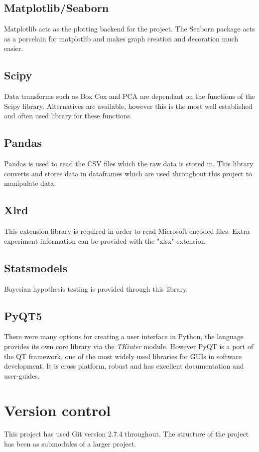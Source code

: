 \documentclass[11pt]{report}
\begin{document}
\subsection{Matplotlib/Seaborn}
\label{sec:org0706bbe}
Matplotlib acts as the plotting backend for the project. The Seaborn package acts as a porcelain for matplotlib and makes graph creation and decoration much easier.
\subsection{Scipy}
\label{sec:orge8a91fb}
Data transforms such as Box Cox and PCA are dependant on the functions of the Scipy library. Alternatives are available, however this is the most well established and often used library for these functions.
\subsection{Pandas}
\label{sec:org3f1ad8c}
Pandas is used to read the CSV files which the raw data is stored in. This library converts and stores data in dataframes which are used throughout this project to manipulate data.
\subsection{Xlrd}
\label{sec:org2e7eeee}
This extension library is required in order to read Microsoft encoded files. Extra experiment information can be provided with the "xlsx" extension.
\subsection{Statsmodels}
\label{sec:orgf190e88}
Bayesian hypothesis testing is provided through this library.
\subsection{PyQT5}
\label{sec:orgbbc5a26}
There were many options for creating a user interface in Python, the language provides its own core library via the \emph{TKinter} module. However PyQT is a port of the QT framework, one of the most widely used libraries for GUIs in software development. It is cross platform, robust and has excellent documentation and user-guides.
\section{Version control}
\label{sec:orge48535e}
This project has used Git version 2.7.4 throughout. The structure of the project has been as submodules of a larger project.
\end{document}
